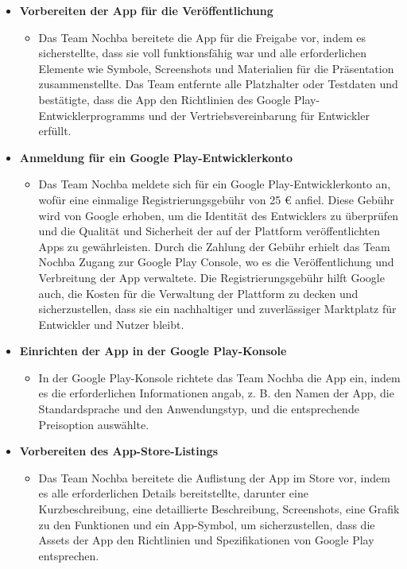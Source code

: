 \begin{itemize}
    \item \textbf{Vorbereiten der App für die Veröffentlichung}
          \begin{itemize}
              \item {Das Team Nochba bereitete die App für die Freigabe vor, indem es sicherstellte, dass sie voll funktionsfähig war und alle erforderlichen Elemente wie Symbole, Screenshots und Materialien für die Präsentation zusammenstellte. Das Team entfernte alle Platzhalter oder Testdaten und bestätigte, dass die App den Richtlinien des Google Play-Entwicklerprogramms und der Vertriebsvereinbarung für Entwickler erfüllt.}
          \end{itemize}
    \item \textbf{Anmeldung für ein Google Play-Entwicklerkonto}
          \begin{itemize}
              \item {Das Team Nochba meldete sich für ein Google Play-Entwicklerkonto an, wofür eine einmalige Registrierungsgebühr von 25 € anfiel. Diese Gebühr wird von Google erhoben, um die Identität des Entwicklers zu überprüfen und die Qualität und Sicherheit der auf der Plattform veröffentlichten Apps zu gewährleisten. Durch die Zahlung der Gebühr erhielt das Team Nochba Zugang zur Google Play Console, wo es die Veröffentlichung und Verbreitung der App verwaltete. Die Registrierungsgebühr hilft Google auch, die Kosten für die Verwaltung der Plattform zu decken und sicherzustellen, dass sie ein nachhaltiger und zuverlässiger Marktplatz für Entwickler und Nutzer bleibt.}
          \end{itemize}
    \item \textbf{Einrichten der App in der Google Play-Konsole}
          \begin{itemize}
              \item {In der Google Play-Konsole richtete das Team Nochba die App ein, indem es die erforderlichen Informationen angab, z. B. den Namen der App, die Standardsprache und den Anwendungstyp, und die entsprechende Preisoption auswählte.}
          \end{itemize}
    \item \textbf{Vorbereiten des App-Store-Listings}
          \begin{itemize}
              \item {Das Team Nochba bereitete die Auflistung der App im Store vor, indem es alle erforderlichen Details bereitstellte, darunter eine Kurzbeschreibung, eine detaillierte Beschreibung, Screenshots, eine Grafik zu den Funktionen und ein App-Symbol, um sicherzustellen, dass die Assets der App den Richtlinien und Spezifikationen von Google Play entsprechen.}

\end{itemize}
\end{itemize}
